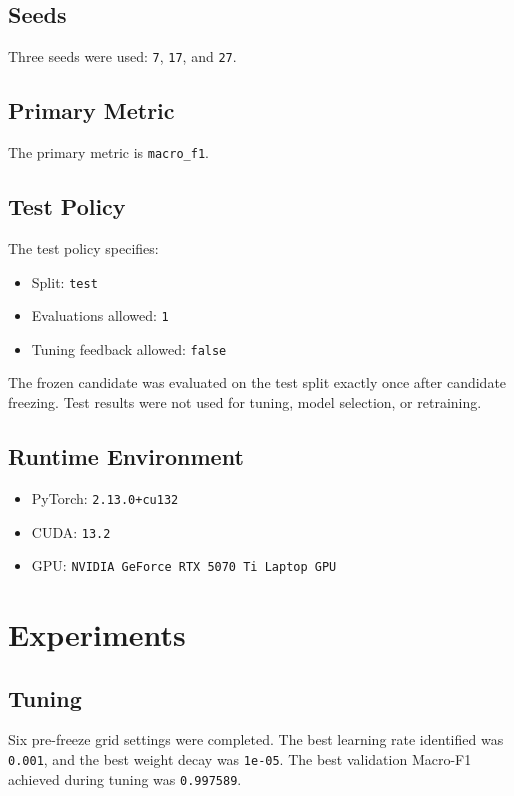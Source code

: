 \documentclass[10pt]{article}
\begin{document}
\subsection{Seeds}
Three seeds were used: \texttt{7}, \texttt{17}, and \texttt{27}.
\subsection{Primary Metric}
The primary metric is \texttt{macro\_f1}.
\subsection{Test Policy}
The test policy specifies:
\begin{itemize}
\item Split: \texttt{test}
\item Evaluations allowed: \texttt{1}
\item Tuning feedback allowed: \texttt{false}
\end{itemize}
The frozen candidate was evaluated on the test split exactly once after candidate freezing. Test results were not used for tuning, model selection, or retraining.
\subsection{Runtime Environment}
\begin{itemize}
\item PyTorch: \texttt{2.13.0+cu132}
\item CUDA: \texttt{13.2}
\item GPU: \texttt{NVIDIA GeForce RTX 5070 Ti Laptop GPU}
\end{itemize}
\section{Experiments}
\subsection{Tuning}
Six pre-freeze grid settings were completed. The best learning rate identified was \texttt{0.001}, and the best weight decay was \texttt{1e-05}. The best validation Macro-F1 achieved during tuning was \texttt{0.997589}.
\end{document}
